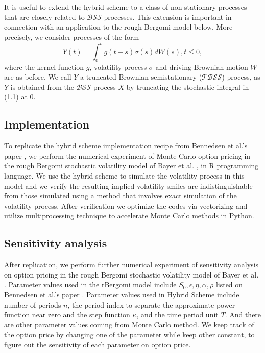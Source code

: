 \documentclass[12pt]{article}
\numberwithin{equation}{section}
\begin{document}
    It is useful to extend the hybrid scheme to a class of non-stationary processes that are closely related to $\mathcal{BSS}$ processes. This extension is important in connection with an application to the rough Bergomi model below. More precisely, we consider processes of the form
    \begin{equation}
      Y(t) = \int_0^tg(t-s)\sigma(s)dW(s), t\le 0,
    \end{equation}
    where the kernel function $g$, volatility process $\sigma$ and driving Brownian motion $W$ are as before. We call $Y$ a truncated Brownian semistationary ($\mathcal{TBSS}$) process, as $Y$ is obtained from the $\mathcal{BSS}$ process $X$ by truncating the stochastic integral in (1.1) at $0$.
    
  \subsection{Implementation}
    
    To replicate the hybrid scheme implementation recipe from Bennedsen et al.'s paper \cite{bennedsen2015hybrid}, we perform the numerical experiment of Monte Carlo option pricing in the rough Bergomi stochastic volatility model of Bayer et al. \cite{bayer2015pricing}, in R programming language. We use the hybrid scheme to simulate the volatility process in this model and we verify the resulting implied volatility smiles are indistinguishable from those simulated using a method that involves exact simulation of the volatility process. After verification we optimize the codes via vectorizing and utilize multiprocessing technique to accelerate Monte Carlo methods in Python.
    
  \subsection{Sensitivity analysis}
    
    After replication, we perform further numerical experiment of sensitivity analysis on option pricing in the rough Bergomi stochastic volatility model of Bayer et al. \cite{bayer2015pricing}. Parameter values used in the rBergomi model include $S_0, \epsilon, \eta, \alpha, \rho$ listed on Bennedsen et al.'s paper \cite{bennedsen2015hybrid}. Parameter values used in Hybrid Scheme include number of periods $n$, the period index to separate the approximate power function near zero and the step function $\kappa$, and the time period unit $T$. And there are other parameter values coming from Monte Carlo method. We keep track of the option price by changing one of the parameter while keep other constant, to figure out the sensitivity of each parameter on option price.
    
\end{document}
